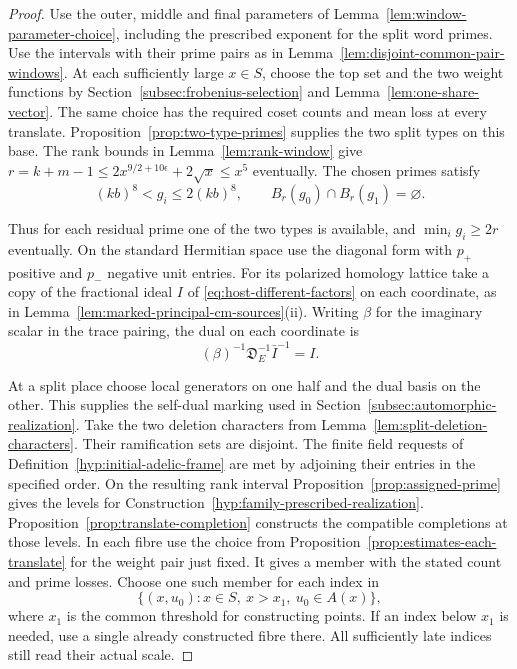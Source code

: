 \begin{proof}
Use the outer, middle and final parameters of
Lemma~\ref{lem:window-parameter-choice}, including the prescribed
exponent for the split word primes. Use the intervals with their
prime pairs as in Lemma~\ref{lem:disjoint-common-pair-windows}.
At each sufficiently large \(x\in S\), choose the top set and the
two weight functions by Section~\ref{subsec:frobenius-selection}
and Lemma~\ref{lem:one-share-vector}. The same choice has the
required coset counts and mean loss at every translate.
Proposition~\ref{prop:two-type-primes} supplies the two split types
on this base. The rank bounds in Lemma~\ref{lem:rank-window} give
\(r=k+m-1\le2x^{9/2+10\epsilon}+2\sqrt{x}\le x^5\)
eventually. The chosen primes satisfy
\[
  (kb)^8<g_i\le 2(kb)^8,\qquad
  B_r(g_0)\cap B_r(g_1)=\varnothing .
\]

Thus for each residual prime one of the two types is available,
and \(\min_i g_i\ge2r\) eventually. On the standard Hermitian
space use the diagonal form with \(p_+\) positive and \(p_-\)
negative unit entries. For its polarized homology lattice take a
copy of the fractional ideal \(I\) of
\eqref{eq:host-different-factors} on each coordinate, as in
Lemma~\ref{lem:marked-principal-cm-sources}(ii).
Writing \(\beta\) for the imaginary scalar in the trace pairing,
the dual on each coordinate is
\[
 (\beta)^{-1}\mathfrak D_E^{-1}\bar I^{-1}=I .
\]

At a split place choose local generators on one half and the dual
basis on the other. This supplies the self-dual marking used in
Section~\ref{subsec:automorphic-realization}. Take the two deletion
characters from Lemma~\ref{lem:split-deletion-characters}. Their
ramification sets are disjoint. The
finite field requests of Definition~\ref{hyp:initial-adelic-frame}
are met by adjoining their entries in the specified order. On the
resulting rank interval Proposition~\ref{prop:assigned-prime}
gives the levels for Construction~\ref{hyp:family-prescribed-realization}.
Proposition~\ref{prop:translate-completion} constructs the compatible
completions at those levels. In each fibre use the choice from
Proposition~\ref{prop:estimates-each-translate} for the weight pair
just fixed. It gives a member with the stated count and prime losses.
Choose one such member for each index in
\[
     \{(x,u_0):x\in S,\ x>x_1,\ u_0\in A(x)\},
\]
where \(x_1\) is the common threshold for constructing points.
If an index below \(x_1\) is needed, use a single already
constructed fibre there. All sufficiently late indices still read
their actual scale.


\end{proof}
